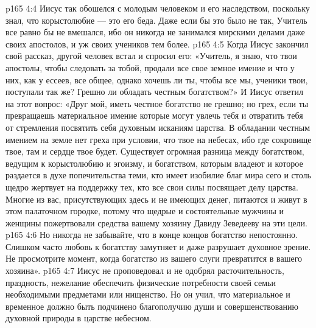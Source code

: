 \vs p165 4:4 \pc Иисус так обошелся с молодым человеком и его наследством, поскольку знал, что корыстолюбие --- это его беда. Даже если бы это было не так, Учитель все равно бы не вмешался, ибо он никогда не занимался мирскими делами даже своих апостолов, и уж своих учеников тем более.
\vs p165 4:5 Когда Иисус закончил свой рассказ, другой человек встал и спросил его: «Учитель, я знаю, что твои апостолы, чтобы следовать за тобой, продали все свое земное имение и что у них, как у ессеев, все общее, однако хочешь ли ты, чтобы все мы, ученики твои, поступали так же? Грешно ли обладать честным богатством?» И Иисус ответил на этот вопрос: «Друг мой, иметь честное богатство не грешно; но грех, если ты превращаешь материальное имение  которые могут увлечь тебя и отвратить тебя от стремления посвятить себя духовным исканиям царства. В обладании честным имением на земле нет греха при условии, что  твое на небесах, ибо где сокровище твое, там и сердце твое будет. Существует огромная разница между богатством, ведущим к корыстолюбию и эгоизму, и богатством, которым владеют и которое раздается в духе попечительства теми, кто имеет изобилие благ мира сего и столь щедро жертвует на поддержку тех, кто все свои силы посвящает делу царства. Многие из вас, присутствующих здесь и не имеющих денег, питаются и живут в этом палаточном городке, потому что щедрые и состоятельные мужчины и женщины пожертвовали средства вашему хозяину Давиду Зеведееву на эти цели.
\vs p165 4:6 Но никогда не забывайте, что в конце концов богатство непостоянно. Слишком часто любовь к богатству замутняет и даже разрушает духовное зрение. Не просмотрите момент, когда богатство из вашего слуги превратится в вашего хозяина».
\vs p165 4:7 \pc Иисус не проповедовал и не одобрял расточительность, праздность, нежелание обеспечить физические потребности своей семьи необходимыми предметами или нищенство. Но он учил, что материальное и временное должно быть подчинено благополучию души и совершенствованию духовной природы в царстве небесном.
